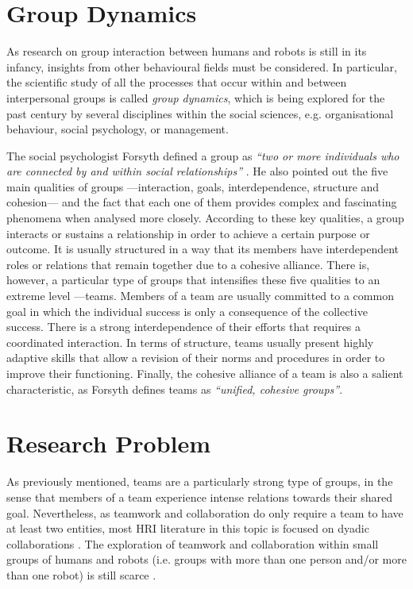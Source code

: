 \section{Group Dynamics}
As research on group interaction between humans and robots is still in its infancy, insights from other behavioural fields must be considered. In particular, the scientific study of all the processes that occur within and between interpersonal groups is called \textit{group dynamics}, which is being explored for the past century by several disciplines within the social sciences, e.g. organisational behaviour, social psychology, or management.

The social psychologist Forsyth defined a group as \textit{``two or more individuals who are connected by and within social relationships''} \cite{forsyth1990group}. He also pointed out the five main qualities of groups ---interaction, goals, interdependence, structure and cohesion--- and the fact that each one of them provides complex and fascinating phenomena when analysed more closely. According to these key qualities, a group interacts or sustains a relationship in order to achieve a certain purpose or outcome. It is usually structured in a way that its members have interdependent roles or relations that remain together due to a cohesive alliance. There is, however, a particular type of groups that intensifies these five qualities to an extreme level ---teams. Members of a team are usually committed to a common goal in which the individual success is only a consequence of the collective success. There is a strong interdependence of their efforts that requires a coordinated interaction. In terms of structure, teams usually present highly adaptive skills that allow a revision of their norms and procedures in order to improve their functioning. Finally, the cohesive alliance of a team is also a salient characteristic, as Forsyth defines teams as \textit{``unified, cohesive groups''}.



\section{Research Problem}
As previously mentioned, teams are a particularly strong type of groups, in the sense that members of a team experience intense relations towards their shared goal. Nevertheless, as teamwork and collaboration do only require a team to have at least two entities, most \gls{HRI} literature in this topic is focused on dyadic collaborations \cite{hoffman2007effects,dragan2015effects,huang2016anticipatory,chang2018effects,shayganfar2019appraisal,hoffman2019evaluating}. The exploration of teamwork and collaboration within small groups of humans and robots (i.e. groups with more than one person and/or more than one robot) is still scarce \cite{fraune2017teammates}.

